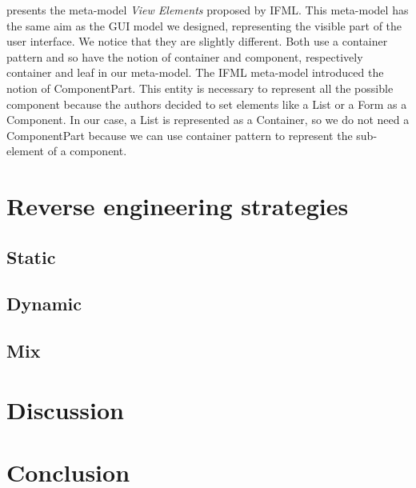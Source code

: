 \documentclass[conference]{IEEEtran}
\begin{document}
 presents the meta-model \textit{View Elements} proposed
    by IFML.
This meta-model has the same aim as the GUI model we designed, \ie representing the
    visible part of the user interface.
We notice that they are slightly different.
Both use a container pattern and so have the notion of container and component, 
    respectively container and leaf in our meta-model.
The IFML meta-model introduced the notion of ComponentPart.
This entity is necessary to represent all the possible component because
    the authors decided to set elements like a List or a Form as a Component.
In our case, a List is represented as a Container,
    so we do not need a ComponentPart because we can use container pattern to
    represent the sub-element of a component.

\section{Reverse engineering strategies}
\label{sec:reverseEngineering}

\subsection{Static}
\label{sec:reverseStatic}

\subsection{Dynamic}
\label{sec:reverseDynamic}

\subsection{Mix}
\label{sec:reverseMix}

\section{Discussion}
\label{sec:discussion}



\section{Conclusion}
\label{sec:conclusion}
\end{document}
